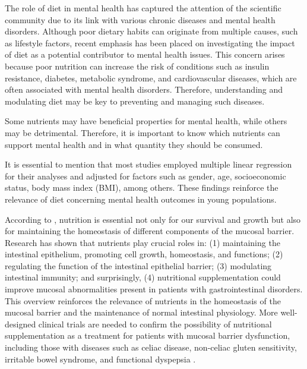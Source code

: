 \documentclass[jou]{apa7}
\begin{document}
The role of diet in mental health has captured the attention of the scientific community due to its link with various chronic diseases and mental health disorders. Although poor dietary habits can originate from multiple causes, such as lifestyle factors, recent emphasis has been placed on investigating the impact of diet as a potential contributor to mental health issues. This concern arises because poor nutrition can increase the risk of conditions such as insulin resistance, diabetes, metabolic syndrome, and cardiovascular diseases, which are often associated with mental health disorders. Therefore, understanding and modulating diet may be key to preventing and managing such diseases.

Some nutrients may have beneficial properties for mental health, while others may be detrimental. Therefore, it is important to know which nutrients can support mental health and in what quantity they should be consumed.

It is essential to mention that most studies employed multiple linear regression for their analyses and adjusted for factors such as gender, age, socioeconomic status, body mass index (BMI), among others. These findings reinforce the relevance of diet concerning mental health outcomes in young populations.

According to \parencite{Farre2020}, nutrition is essential not only for our survival and growth but also for maintaining the homeostasis of different components of the mucosal barrier. Research has shown that nutrients play crucial roles in: (1) maintaining the intestinal epithelium, promoting cell growth, homeostasis, and functions; (2) regulating the function of the intestinal epithelial barrier; (3) modulating intestinal immunity; and surprisingly, (4) nutritional supplementation could improve mucosal abnormalities present in patients with gastrointestinal disorders.\\

This overview reinforces the relevance of nutrients in the homeostasis of the mucosal barrier and the maintenance of normal intestinal physiology. More well-designed clinical trials are needed to confirm the possibility of nutritional supplementation as a treatment for patients with mucosal barrier dysfunction, including those with diseases such as celiac disease, non-celiac gluten sensitivity, irritable bowel syndrome, and functional dyspepsia \parencite{Farre2020}.

\end{document}
